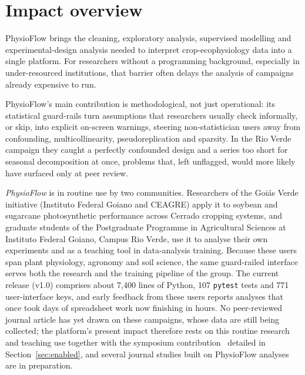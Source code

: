 \documentclass[11pt, letterpaper]{article}
\begin{document}
\section{Impact overview}\label{sec:impact}

PhysioFlow brings the cleaning, exploratory analysis, supervised modelling and experimental-design analysis needed to interpret crop-ecophysiology data into a single platform. For researchers without a programming background, especially in under-resourced institutions, that barrier often delays the analysis of campaigns already expensive to run.

PhysioFlow's main contribution is methodological, not just operational: its statistical guard-rails turn assumptions that researchers usually check informally, or skip, into explicit on-screen warnings, steering non-statistician users away from confounding, multicollinearity, pseudoreplication and sparsity. In the Rio Verde campaign they caught a perfectly confounded design and a series too short for seasonal decomposition at once, problems that, left unflagged, would more likely have surfaced only at peer review.

\emph{PhysioFlow} is in routine use by two communities. Researchers of the Goi\'as Verde initiative (Instituto Federal Goiano and CEAGRE) apply it to soybean and sugarcane photosynthetic performance across Cerrado cropping systems, and graduate students of the Postgraduate Programme in Agricultural Sciences at Instituto Federal Goiano, Campus Rio Verde, use it to analyse their own experiments and as a teaching tool in data-analysis training. Because these users span plant physiology, agronomy and soil science, the same guard-railed interface serves both the research and the training pipeline of the group. The current release (v1.0) comprises about 7{,}400 lines of Python, 107 \texttt{pytest} tests and 771 user-interface keys, and early feedback from these users reports analyses that once took days of spreadsheet work now finishing in hours. No peer-reviewed journal article has yet drawn on these campaigns, whose data are still being collected; the platform's present impact therefore rests on this routine research and teaching use together with the symposium contribution~\cite{DaSilva2026Goias} detailed in Section~\ref{sec:enabled}, and several journal studies built on PhysioFlow analyses are in preparation.

\end{document}
